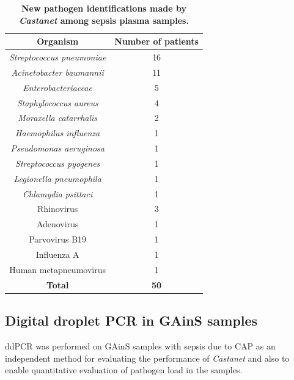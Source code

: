 \begin{table}[]
\begin{center}
\begin{tabular}{|c|c|}
\hline
\textbf{Organism}                 & \textbf{Number of patients} \\ \hline
\textit{Streptococcus pneumoniae} & 16                          \\ \hline
\textit{Acinetobacter baumannii}  & 11                          \\ \hline
\textit{Enterobacteriaceae}       & 5                           \\ \hline
\textit{Staphylococcus aureus}    & 4                           \\ \hline
\textit{Moraxella catarrhalis}    & 2                           \\ \hline
\textit{Haemophilus influenza}    & 1                           \\ \hline
\textit{Pseudomonas aeruginosa}   & 1                           \\ \hline
\textit{Streptococcus pyogenes}   & 1                           \\ \hline
\textit{Legionella pneumophila}   & 1                           \\ \hline
\textit{Chlamydia psittaci}       & 1                           \\ \hline
Rhinovirus                        & 3                           \\ \hline
Adenovirus                        & 1                           \\ \hline
Parvovirus B19                    & 1                           \\ \hline
Influenza A                       & 1                           \\ \hline
Human metapneumovirus             & 1                           \\ \hline
\textbf{Total}                    & \textbf{50}                 \\ \hline
\end{tabular}
\end{center}
\smallskip
\caption[New pathogens identified by \textit{Castanet}] {\textbf{New pathogen identifications made by \textit{Castanet} among sepsis plasma samples.} } 
\label{tab:gains-unknown}
\end{table}



\subsection{Digital droplet PCR in GAinS samples}
ddPCR was performed on GAinS samples with sepsis due to CAP as an independent method for evaluating the performance of \textit{Castanet} and also to enable quantitative evaluation of pathogen load in the samples.

